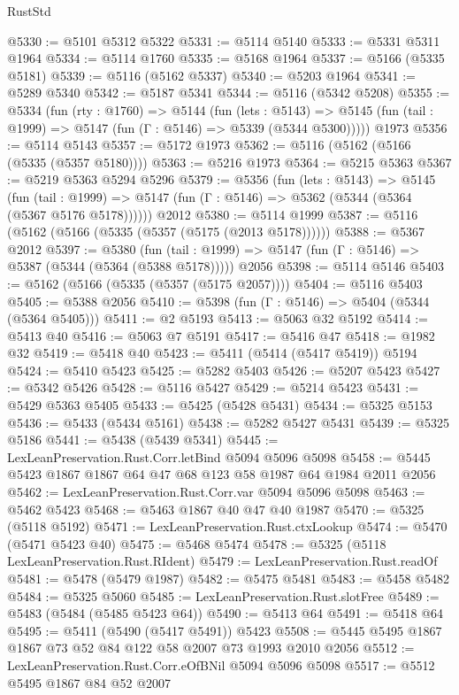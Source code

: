 \begin{lexlean}{RustStd}
\begin{coremodule}
@5330 := @5101 @5312 @5322
@5331 := @5114 @5140
@5333 := @5331 @5311 @1964
@5334 := @5114 @1760
@5335 := @5168 @1964
@5337 := @5166 (@5335 @5181)
@5339 := @5116 (@5162 @5337)
@5340 := @5203 @1964
@5341 := @5289 @5340
@5342 := @5187 @5341
@5344 := @5116 (@5342 @5208)
@5355 := @5334
    (fun (rty : @1760) =>
    @5144
      (fun (lets : @5143) =>
      @5145 (fun (tail : @1999) => @5147 (fun (Γ : @5146) => @5339 (@5344 @5300)))))
    @1973
@5356 := @5114 @5143
@5357 := @5172 @1973
@5362 := @5116 (@5162 (@5166 (@5335 (@5357 @5180))))
@5363 := @5216 @1973
@5364 := @5215 @5363
@5367 := @5219 @5363 @5294 @5296
@5379 := @5356
    (fun (lets : @5143) =>
    @5145
      (fun (tail : @1999) => @5147 (fun (Γ : @5146) => @5362 (@5344 (@5364 (@5367 @5176 @5178))))))
    @2012
@5380 := @5114 @1999
@5387 := @5116 (@5162 (@5166 (@5335 (@5357 (@5175 (@2013 @5178))))))
@5388 := @5367 @2012
@5397 := @5380
    (fun (tail : @1999) => @5147 (fun (Γ : @5146) => @5387 (@5344 (@5364 (@5388 @5178)))))
    @2056
@5398 := @5114 @5146
@5403 := @5162 (@5166 (@5335 (@5357 (@5175 @2057))))
@5404 := @5116 @5403
@5405 := @5388 @2056
@5410 := @5398 (fun (Γ : @5146) => @5404 (@5344 (@5364 @5405)))
@5411 := @2 @5193
@5413 := @5063 @32 @5192
@5414 := @5413 @40
@5416 := @5063 @7 @5191
@5417 := @5416 @47
@5418 := @1982 @32
@5419 := @5418 @40
@5423 := @5411 (@5414 (@5417 @5419)) @5194
@5424 := @5410 @5423
@5425 := @5282 @5403
@5426 := @5207 @5423
@5427 := @5342 @5426
@5428 := @5116 @5427
@5429 := @5214 @5423
@5431 := @5429 @5363 @5405
@5433 := @5425 (@5428 @5431)
@5434 := @5325 @5153
@5436 := @5433 (@5434 @5161)
@5438 := @5282 @5427 @5431
@5439 := @5325 @5186
@5441 := @5438 (@5439 @5341)
@5445 := LexLeanPreservation.Rust.Corr.letBind @5094 @5096 @5098
@5458 := @5445 @5423 @1867 @1867 @64 @47 @68 @123 @58 @1987 @64 @1984 @2011 @2056
@5462 := LexLeanPreservation.Rust.Corr.var @5094 @5096 @5098
@5463 := @5462 @5423
@5468 := @5463 @1867 @40 @47 @40 @1987
@5470 := @5325 (@5118 @5192)
@5471 := LexLeanPreservation.Rust.ctxLookup
@5474 := @5470 (@5471 @5423 @40)
@5475 := @5468 @5474
@5478 := @5325 (@5118 LexLeanPreservation.Rust.RIdent)
@5479 := LexLeanPreservation.Rust.readOf
@5481 := @5478 (@5479 @1987)
@5482 := @5475 @5481
@5483 := @5458 @5482
@5484 := @5325 @5060
@5485 := LexLeanPreservation.Rust.slotFree
@5489 := @5483 (@5484 (@5485 @5423 @64))
@5490 := @5413 @64
@5491 := @5418 @64
@5495 := @5411 (@5490 (@5417 @5491)) @5423
@5508 := @5445 @5495 @1867 @1867 @73 @52 @84 @122 @58 @2007 @73 @1993 @2010 @2056
@5512 := LexLeanPreservation.Rust.Corr.eOfBNil @5094 @5096 @5098
@5517 := @5512 @5495 @1867 @84 @52 @2007

\end{coremodule}
\end{lexlean}

